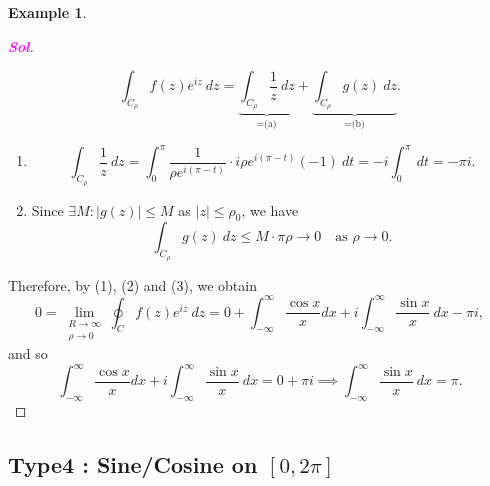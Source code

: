 \documentclass[12pt,openany]{book}
\theoremstyle{definition}
\newtheorem{example}{Example}[section]
\newcommand{\abs}[1]{\left\lvert #1 \right\rvert}
\newcommand{\sol}{\textcolor{magenta}{\bf Sol}}
\begin{document}
\begin{example}
\begin{proof}[\sol]
\begin{enumerate}[(1)]
\[				\int_{C_\rho}f(z)e^{iz}\ dz=\underbrace{\int_{C_\rho}\frac{1}{z}\ dz}_{=\text{(a)}}+\underbrace{\int_{C_\rho} g(z)\ dz}_{=\text{(b)}}.
				\] \begin{enumerate}
					\item \[
					\int_{C_\rho}\frac{1}{z}\ dz=\int_0^{\pi}\frac{1}{\rho e^{i(\pi-t)}}\cdot i\rho e^{i(\pi-t)}(-1)\ dt=-i\int_0^{\pi}\ dt=-\pi i.
					\]
					\item Since $\exists M:\abs{g(z)}\leq M$ as $\abs{z}\leq\rho_0$, we have \[
					\int_{C_\rho}g(z)\ dz\leq M\cdot \pi\rho\to 0\quad\text{as $\rho\to 0$}.
					\]
				\end{enumerate}
			\end{enumerate}
			Therefore, by (1), (2) and (3), we obtain \[
			0=\lim\limits_{\substack{R\to\infty\\ \rho\to 0}}\oint_C f(z)e^{iz}\ dz=0+\int_{-\infty}^{\infty}\frac{\cos x}{x}dx + i\int_{-\infty}^{\infty}\frac{\sin x}{x}\ dx-\pi i,
			\] and so \[
			\int_{-\infty}^{\infty}\frac{\cos x}{x}dx + i\int_{-\infty}^{\infty}\frac{\sin x}{x}\ dx=0+\pi i\implies\boxed{\int_{-\infty}^{\infty}\frac{\sin x}{x}\ dx=\pi}.
			\]
		\end{proof}
	\end{example}
	
	\newpage
	\subsection{Type4 : Sine/Cosine on $[0,2\pi]$}
	
\end{document}
